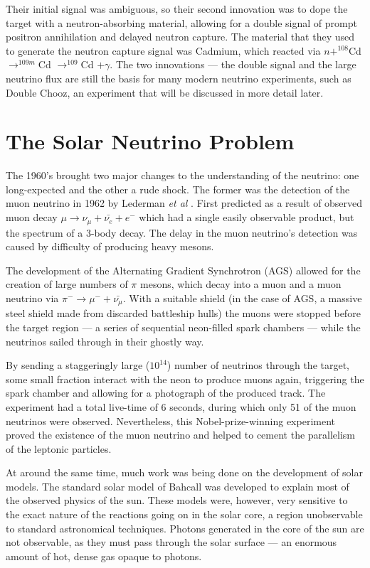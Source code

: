  Their initial signal was ambiguous, so their second innovation was to dope the target with a neutron-absorbing material, allowing for a double signal of prompt positron annihilation and delayed neutron capture. The material that they used to generate the neutron capture signal was Cadmium, which reacted via $ n+ ^{108}$Cd $\rightarrow ^{109m}$Cd $ \rightarrow ^{109}$Cd $+ \gamma$.  The two innovations --- the double signal and the large neutrino flux are still the basis for many modern neutrino experiments, such as Double Chooz, an experiment that will be discussed in more detail later. 


\section{The Solar Neutrino Problem}
The 1960's brought two major changes to the understanding of the neutrino: one long-expected and the other a rude shock. The former was the detection of the muon neutrino in 1962 by Lederman \emph{et al} \cite{Lederman}. First predicted as a result of observed muon decay $\mu \rightarrow \nu_{\mu} + \bar{\nu_{e}} + e^-$  which had a single easily observable product, but the spectrum of a 3-body decay. The delay in the muon neutrino's detection was caused by difficulty of producing heavy mesons. 

The development of the Alternating Gradient Synchrotron (AGS) allowed for the creation of large numbers of $\pi$ mesons, which decay into a muon and a muon neutrino via $\pi^{-} \rightarrow \mu^{-} + \bar{\nu_{\mu}}$. With a suitable shield  (in the case of AGS, a massive steel shield made from discarded battleship hulls) the muons were stopped before the target region --- a series of sequential neon-filled spark chambers --- while the neutrinos sailed through in their ghostly way. 

By sending a staggeringly large ($10^{14}$) number of neutrinos through the target, some small fraction interact with the neon to produce muons again, triggering the spark chamber and allowing for a photograph of the produced track. The experiment had a total live-time of 6 seconds, during which only 51 of the muon neutrinos were observed. Nevertheless, this Nobel-prize-winning experiment proved the existence of the muon neutrino and helped to cement the parallelism of the leptonic particles. 

At around the same time, much work was being done on the development of solar models. The standard solar model of Bahcall \cite {bahcall_intro_95} was developed to explain most of the observed physics of the sun. These models were, however, very sensitive to the exact nature of the reactions going on in the solar core, a region unobservable to standard astronomical techniques. Photons generated in the core of the sun are not observable, as they must pass through the solar surface --- an enormous amount of hot, dense gas opaque to photons.

